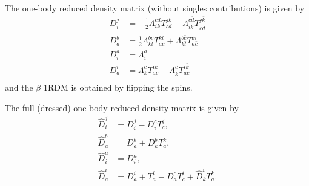 \documentclass[a4paper,12pt,oneside]{book}
\newcommand{\half}{\frac{1}{2}}
\newcommand{\spa}[1]{{#1}}
\newcommand{\spb}[1]{\bar{#1}}
\begin{document}
The one-body reduced density matrix (without singles contributions) is given by
\begin{equation}
\begin{aligned}
  D_{\spa{i}}^{\spa{j}} &= - \half\Lambda_{\spa{i}\spa{k}}^{\spa{c}\spa{d}} T^{\spa{j}\spa{k}}_{\spa{c}\spa{d}} 
  -\Lambda_{\spa{i}\spb{k}}^{\spa{c}\spb{d}} T^{\spa{j}\spb{k}}_{\spa{c}\spb{d}}\\
  D_{\spa{a}}^{\spa{b}} &= \half\Lambda_{\spa{k}\spa{l}}^{\spa{b}\spa{c}} T^{\spa{k}\spa{l}}_{\spa{a}\spa{c}}
  +\Lambda_{\spa{k}\spb{l}}^{\spa{b}\spb{c}} T^{\spa{k}\spb{l}}_{\spa{a}\spb{c}}\\
  D_{\spa{i}}^{\spa{a}} &= \Lambda_{\spa{i}}^{\spa{a}} \\
  D_{\spa{a}}^{\spa{i}} &= \Lambda_{\spa{k}}^{\spa{c}} T^{\spa{i}\spa{k}}_{\spa{a}\spa{c}} 
  + \Lambda_{\spb{k}}^{\spb{c}} T^{\spa{i}\spb{k}}_{\spa{a}\spb{c}}\\
\end{aligned}
\end{equation}
and the $\beta$ 1RDM is obtained by flipping the spins.

The full (dressed) one-body reduced density matrix is given by
\begin{equation}
\begin{aligned}
  \hat D_{\spa{i}}^{\spa{j}} &= D_{\spa{i}}^{\spa{j}} - D_{\spa{i}}^{\spa{c}} T^{\spa{j}}_{\spa{c}}, \\
  \hat D_{\spa{a}}^{\spa{b}} &= D_{\spa{a}}^{\spa{b}} + D_{\spa{k}}^{\spa{b}} T^{\spa{k}}_{\spa{a}}, \\
  \hat D_{\spa{i}}^{\spa{a}} &= D_{\spa{i}}^{\spa{a}},\\
  \hat D_{\spa{a}}^{\spa{i}} &= D_{\spa{a}}^{\spa{i}} + T^{\spa{i}}_{\spa{a}} 
  - D_{\spa{a}}^{\spa{c}} T^{\spa{i}}_{\spa{c}} + \hat D_{\spa{k}}^{\spa{i}} T^{\spa{k}}_{\spa{a}}.
\end{aligned}
\end{equation}
\end{document}

